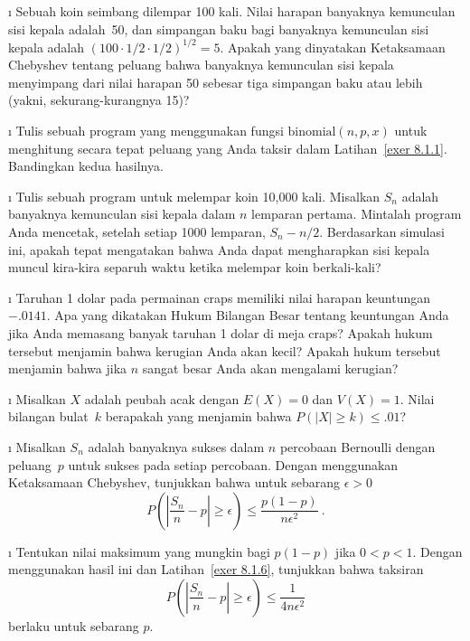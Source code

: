 \exercises
\begin{LJSItem}

\i\label{exer 8.1.1} Sebuah koin seimbang dilempar 100 kali.  Nilai harapan banyaknya kemunculan
sisi kepala adalah~50, dan simpangan baku bagi banyaknya kemunculan sisi kepala adalah $(100 \cdot
1/2 \cdot 1/2)^{1/2} = 5$.  Apakah yang dinyatakan Ketaksamaan Chebyshev tentang
peluang bahwa banyaknya kemunculan sisi kepala menyimpang dari nilai harapan
50 sebesar tiga simpangan baku atau lebih (yakni, sekurang-kurangnya 15)?

\i\label{exer 8.1.100} Tulis sebuah program yang menggunakan fungsi 
$\mbox {binomial}(n,p,x)$ untuk menghitung secara tepat peluang yang Anda taksir dalam
Latihan~\ref{exer 8.1.1}.  Bandingkan kedua hasilnya.

\i\label{exer 8.1.101} Tulis sebuah program untuk melempar koin 10{,}000 kali.  Misalkan $S_n$ adalah
banyaknya kemunculan sisi kepala dalam $n$ lemparan pertama.  Mintalah program Anda mencetak, setelah setiap
1000 lemparan, $S_n - n/2$.  Berdasarkan simulasi ini, apakah tepat
mengatakan bahwa Anda dapat mengharapkan sisi kepala muncul kira-kira separuh waktu ketika melempar koin
berkali-kali?

\i\label{exer 8.1.102} Taruhan 1 dolar pada permainan craps memiliki nilai harapan keuntungan $-.0141$.  Apa
yang dikatakan Hukum Bilangan Besar tentang keuntungan Anda jika Anda memasang banyak
taruhan 1 dolar di meja craps?  Apakah hukum tersebut menjamin bahwa kerugian Anda akan
kecil?  Apakah hukum tersebut menjamin bahwa jika $n$ sangat besar Anda akan mengalami kerugian?

\i\label{exer 8.1.103} Misalkan $X$ adalah peubah acak dengan $E(X) =0$ dan $V(X) = 1$.  Nilai
bilangan bulat~$k$ berapakah yang menjamin bahwa $P(|X| \geq k) \leq .01$?

\i\label{exer 8.1.6} Misalkan $S_n$ adalah banyaknya sukses dalam $n$ percobaan
Bernoulli dengan peluang~$p$ untuk sukses pada setiap percobaan.  Dengan menggunakan Ketaksamaan
Chebyshev, tunjukkan bahwa untuk sebarang $\epsilon > 0$
$$
P\left( \left| \frac {S_n}n - p \right| \geq \epsilon \right) \leq \frac {p(1 -
p)}{n\epsilon^2}\ .
$$

\i\label{exer 8.1.7} Tentukan nilai maksimum yang mungkin bagi $p(1 - p)$ jika $0 < p
< 1$.  Dengan menggunakan hasil ini dan Latihan~\ref{exer 8.1.6}, tunjukkan bahwa taksiran
$$
P\left( \left| \frac {S_n}n - p \right| \geq \epsilon \right) \leq \frac
1{4n\epsilon^2}
$$
berlaku untuk sebarang $p$.


\end{LJSItem}
